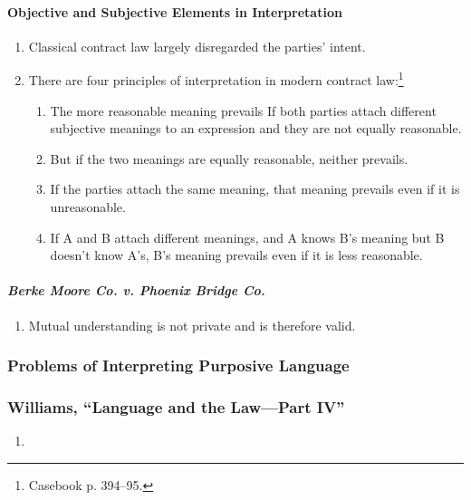 \paragraph{Objective and Subjective Elements in Interpretation}

\begin{enumerate}
    \item Classical contract law largely disregarded the parties' intent.
    \item There are four principles of interpretation in modern contract 
    law:\footnote{Casebook p. 394--95.}
    \begin{enumerate}
        \item The more reasonable meaning prevails If both parties attach 
        different subjective meanings to an expression  and they 
        are not equally reasonable.
        \item But if the two meanings are equally reasonable, neither 
        prevails.
        \item If the parties attach the same meaning, that meaning prevails 
        even if it is unreasonable.
        \item If A and B attach different meanings, and A knows B's meaning 
        but B doesn't know A's, B's meaning prevails even if it is less 
        reasonable.
    \end{enumerate}
\end{enumerate}

\paragraph{\emph{Berke Moore Co. v. Phoenix Bridge Co.}}

\begin{enumerate}
    \item Mutual understanding is not private and is therefore valid.
\end{enumerate}

\subsubsection{Problems of Interpreting Purposive Language}

\subsubsection{Williams, ``Language and the Law---Part IV''}

\begin{enumerate}
    \item %
\end{enumerate}

